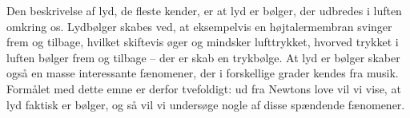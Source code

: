 Den beskrivelse af lyd, de fleste kender, er at lyd er bølger, der udbredes i luften omkring os. Lydbølger skabes ved, at eksempelvis en højtalermembran svinger frem og tilbage, hvilket skiftevis øger og mindsker lufttrykket, hvorved trykket i luften bølger frem og tilbage -- der er skab en trykbølge. At lyd er bølger skaber også en masse interessante fænomener, der i forskellige grader kendes fra musik. Formålet med dette emne er derfor tvefoldigt: ud fra Newtons love vil vi vise, at lyd faktisk er bølger, og så vil vi undersøge nogle af disse spændende fænomener.